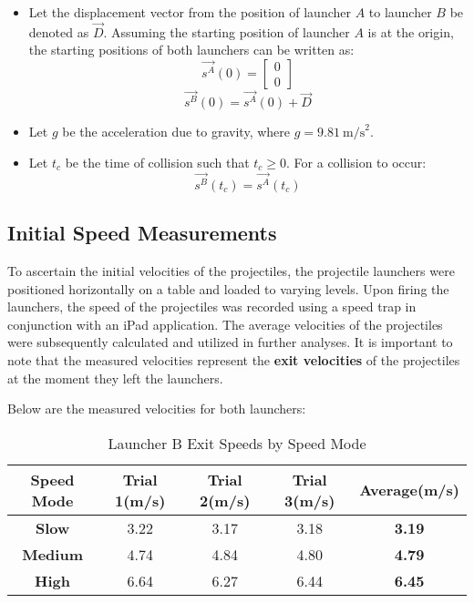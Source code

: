 \documentclass[12pt]{article}
\begin{document}
\begin{itemize}
\begin{itemize}
    \end{itemize}

    \item Let the displacement vector from the position of launcher $A$ to launcher $B$ be denoted as \(\vec{D}\). Assuming the starting position of launcher $A$ is at the origin, the starting positions of both launchers can be written as:
    \[
    \vec{s^A}(0) = \begin{bmatrix} 0 \\ 0 \end{bmatrix}
    \]
    \[
    \vec{s^B}(0) = \vec{s^A}(0) + \vec{D}
    \]
    \item Let $g$ be the acceleration due to gravity, where \( g = 9.81 \ \text{m/s}^2 \).
    \item Let $t_c$ be the time of collision such that \( t_c \geq 0 \). For a collision to occur:
        \[
            \vec{s^B}(t_c) = \vec{s^A}(t_c)
        \]

\end{itemize}

\subsection{Initial Speed Measurements}
To ascertain the initial velocities of the projectiles, the projectile launchers were positioned horizontally on a table and loaded to varying levels. Upon firing the launchers, the speed of the projectiles was recorded using a speed trap in conjunction with an iPad application. The average velocities of the projectiles were subsequently calculated and utilized in further analyses. It is important to note that the measured velocities represent the \textbf{exit velocities} of the projectiles at the moment they left the launchers.

Below are the measured velocities for both launchers:

\renewcommand{\arraystretch}{1.1 }
\begin{table}[H]
    \centering
    \begin{tabular}{|c|c|c|c|c|}
        \hline
        \textbf{Speed Mode} & \textbf{Trial 1}(m/s) & \textbf{Trial 2}(m/s) & \textbf{Trial 3}(m/s) & \textbf{Average}(m/s)\\ 
        \hline
        \textbf{Slow} & 3.22 & 3.17 & 3.18 & \textbf{3.19} \\ 
        \hline
        \textbf{Medium} & 4.74 & 4.84 & 4.80 & \textbf{4.79} \\ 
        \hline
        \textbf{High} & 6.64 & 6.27 & 6.44 & \textbf{6.45} \\ 
        \hline
    \end{tabular}
    \caption{Launcher B Exit Speeds by Speed Mode}
    \label{table:ISA}
\end{table}
\end{document}
